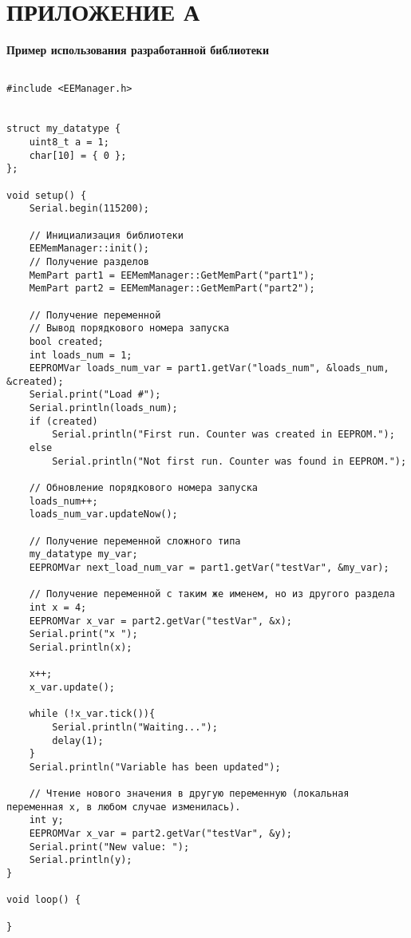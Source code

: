 \chapter*{ПРИЛОЖЕНИЕ А} \label{app:appendix-usage-example}

\begin{center}
    \bfseries Пример использования разработанной библиотеки
\end{center}

\begin{verbatim}
    
#include <EEManager.h>


struct my_datatype {
    uint8_t a = 1;
    char[10] = { 0 };
};

void setup() {
    Serial.begin(115200);

    // Инициализация библиотеки
    EEMemManager::init();
    // Получение разделов
    MemPart part1 = EEMemManager::GetMemPart("part1");
    MemPart part2 = EEMemManager::GetMemPart("part2");

    // Получение переменной
    // Вывод порядкового номера запуска
    bool created;
    int loads_num = 1;
    EEPROMVar loads_num_var = part1.getVar("loads_num", &loads_num, &created);
    Serial.print("Load #");
    Serial.println(loads_num);
    if (created)
        Serial.println("First run. Counter was created in EEPROM.");
    else
        Serial.println("Not first run. Counter was found in EEPROM.");

    // Обновление порядкового номера запуска
    loads_num++;
    loads_num_var.updateNow();

    // Получение переменной сложного типа
    my_datatype my_var;
    EEPROMVar next_load_num_var = part1.getVar("testVar", &my_var);

    // Получение переменной с таким же именем, но из другого раздела
    int x = 4;
    EEPROMVar x_var = part2.getVar("testVar", &x);
    Serial.print("x ");
    Serial.println(x);

    x++;
    x_var.update();

    while (!x_var.tick()){
        Serial.println("Waiting...");
        delay(1);
    }
    Serial.println("Variable has been updated");

    // Чтение нового значения в другую переменную (локальная переменная x, в любом случае изменилась).
    int y;
    EEPROMVar x_var = part2.getVar("testVar", &y);
    Serial.print("New value: ");
    Serial.println(y);
}

void loop() {

}
\end{verbatim}
